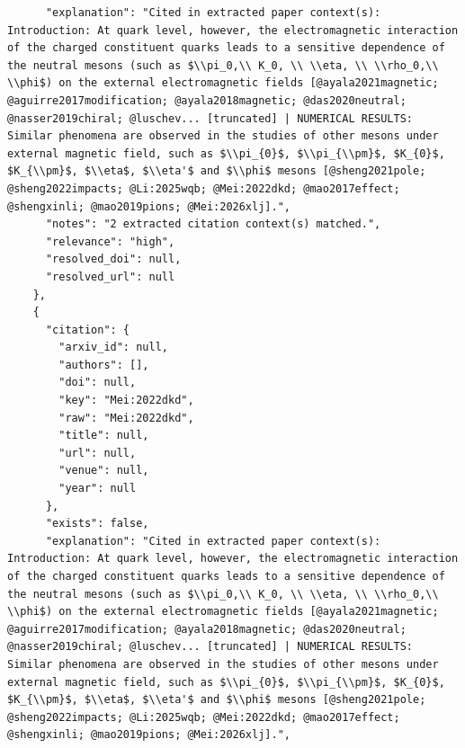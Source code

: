\documentclass[11pt]{article}
\begin{document}
\begin{verbatim}
      "explanation": "Cited in extracted paper context(s): Introduction: At quark level, however, the electromagnetic interaction of the charged constituent quarks leads to a sensitive dependence of the neutral mesons (such as $\\pi_0,\\ K_0, \\ \\eta, \\ \\rho_0,\\ \\phi$) on the external electromagnetic fields [@ayala2021magnetic; @aguirre2017modification; @ayala2018magnetic; @das2020neutral; @nasser2019chiral; @luschev... [truncated] | NUMERICAL RESULTS: Similar phenomena are observed in the studies of other mesons under external magnetic field, such as $\\pi_{0}$, $\\pi_{\\pm}$, $K_{0}$, $K_{\\pm}$, $\\eta$, $\\eta'$ and $\\phi$ mesons [@sheng2021pole; @sheng2022impacts; @Li:2025wqb; @Mei:2022dkd; @mao2017effect; @shengxinli; @mao2019pions; @Mei:2026xlj].",
      "notes": "2 extracted citation context(s) matched.",
      "relevance": "high",
      "resolved_doi": null,
      "resolved_url": null
    },
    {
      "citation": {
        "arxiv_id": null,
        "authors": [],
        "doi": null,
        "key": "Mei:2022dkd",
        "raw": "Mei:2022dkd",
        "title": null,
        "url": null,
        "venue": null,
        "year": null
      },
      "exists": false,
      "explanation": "Cited in extracted paper context(s): Introduction: At quark level, however, the electromagnetic interaction of the charged constituent quarks leads to a sensitive dependence of the neutral mesons (such as $\\pi_0,\\ K_0, \\ \\eta, \\ \\rho_0,\\ \\phi$) on the external electromagnetic fields [@ayala2021magnetic; @aguirre2017modification; @ayala2018magnetic; @das2020neutral; @nasser2019chiral; @luschev... [truncated] | NUMERICAL RESULTS: Similar phenomena are observed in the studies of other mesons under external magnetic field, such as $\\pi_{0}$, $\\pi_{\\pm}$, $K_{0}$, $K_{\\pm}$, $\\eta$, $\\eta'$ and $\\phi$ mesons [@sheng2021pole; @sheng2022impacts; @Li:2025wqb; @Mei:2022dkd; @mao2017effect; @shengxinli; @mao2019pions; @Mei:2026xlj].",

\end{verbatim}
\end{document}
